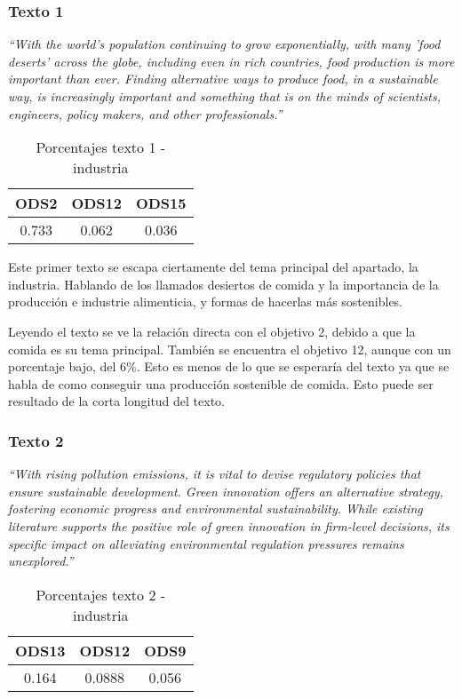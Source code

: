 \subsubsection{Texto 1}
\begin{center}
    \textit{``With the world's population continuing to grow exponentially, with
    many 'food deserts' across the globe, including even in rich countries, food
    production is more important than ever. Finding alternative ways to produce
    food, in a sustainable way, is increasingly important and something that is
    on the minds of scientists, engineers, policy makers, and other
    professionals.''}\cite{validationtexts4}
    \begin{table}[H]
        \begin{tabular}{c | c | c }
            \hline
            ODS2 & ODS12 & ODS15\\ \hline
            0.733 & 0.062 & 0.036\\ \hline
        \end{tabular}
        \caption{Porcentajes texto 1 - industria}
\end{table}
\end{center}

Este primer texto se escapa ciertamente del tema principal del apartado, la
industria. Hablando de los llamados desiertos de comida y la importancia de la
producción e industrie alimenticia, y formas de hacerlas más sostenibles.

Leyendo el texto se ve la relación directa con el objetivo 2, debido a que la
comida es su tema principal. También se encuentra el objetivo 12, aunque con un
porcentaje bajo, del 6\%. Esto es menos de lo que se esperaría del texto ya que
se habla de como conseguir una producción sostenible de comida. Esto puede ser
resultado de la corta longitud del texto. 


\subsubsection{Texto 2}
\begin{center}
    \textit{``With rising pollution emissions, it is vital to devise regulatory
    policies that ensure sustainable development. Green innovation offers an
    alternative strategy, fostering economic progress and environmental
    sustainability. While existing literature supports the positive role of
    green innovation in firm-level decisions, its specific impact on alleviating
    environmental regulation pressures remains
    unexplored.''}\cite{validationtexts5}
    \begin{table}[H]
        \begin{tabular}{c | c | c }
            \hline
            ODS13 & ODS12 & ODS9 \\ \hline
            0.164 & 0.0888 & 0.056\\ \hline
        \end{tabular}
        \caption{Porcentajes texto 2 - industria}
\end{table}
\end{center}

